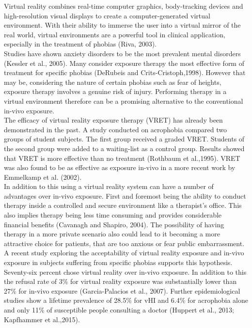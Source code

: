 

Virtual reality combines real-time computer graphics, body-tracking devices and high-resolution visual displays to create a computer-generated virtual environment. With their ability to immerse the user into a virtual mirror of the real world, virtual environments are a powerful tool in clinical application, especially in the treatment of phobias (Riva, 2003). \\
Studies have shown anxiety disorders to be the most prevalent mental disorders (Kessler et al., 2005). Many consider exposure therapy the most effective form of treatment for specific phobias (DeRubeis and Crits-Cristoph,1998). However that may be, considering the nature of certain phobias such as fear of heights, exposure therapy involves a genuine risk of injury. Performing therapy in a virtual environment therefore can be a promising alternative to the conventional in-vivo exposure.\\ 
The efficacy of virtual reality exposure therapy (VRET) has already been demonstrated in the past. A study conducted on acrophobia compared two groups of student subjects. The first group received a graded VRET. Students of the second group were added to a waiting-list as a control group. Results showed that VRET is more effective than no treatment (Rothbaum et al.,1995). VRET was also found to be as effective as exposure in-vivo in a more recent work by Emmelkamp et al. (2002).\\
In addition to this using a virtual reality system can have a number of advantages over in-vivo exposure. First and foremost being the ability to conduct therapy inside a controlled and secure environment like a therapist's office. This also implies therapy being less time consuming and provides considerable financial benefits (Cavanagh and Shapiro, 2004). The possibility of having therapy in a more private scenario also could lead to it becoming a more attractive choice for patients, that are too anxious or fear public embarrassment. 
A recent study exploring the acceptability of virtual reality exposure and in-vivo exposure in subjects suffering from specific phobias supports this hypothesis. Seventy-six percent chose virtual reality over in-vivo exposure. In addition to this the refusal rate of 3\% for virtual reality exposure was substantially lower than 27\% for in-vivo exposure (Garcia-Palacios et al., 2007). Further epidemiological studies show a lifetime prevalence of 28.5\% for vHI and 6.4\% for acrophobia alone and only 11\% of susceptible people consulting a doctor (Huppert et al., 2013; Kapfhammer et al.,2015).\\
